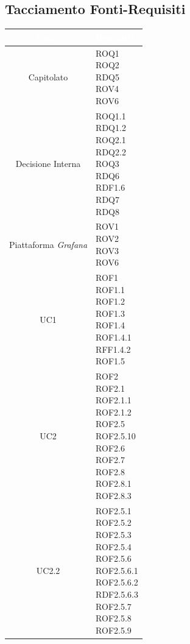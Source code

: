 \subsection{Tacciamento Fonti-Requisiti}\label{Tracciamento}
\begin{center}
\begin{longtable}[c]{|c|m{}|}
\hline
\rowcolor{bluelogo}\textbf{\textcolor{white}{Fonte}} & \textbf{\textcolor{white}{Requisiti}}\\
\hline \hline
\endhead
Capitolato & \makecell{ROQ1\\ROQ2\\RDQ5\\ROV4\\ROV6}\\
\hline
\rowcolor{grigio}Decisione Interna & \makecell{ROQ1.1\\RDQ1.2\\ROQ2.1\\RDQ2.2\\ROQ3\\RDQ6\\RDF1.6\\RDQ7\\RDQ8}\\
\hline
Piattaforma \textit{Grafana} & \makecell{ROV1\\ROV2\\ROV3\\ROV6}\\
\hline
\rowcolor{grigio}UC1 & \makecell{ROF1\\ROF1.1\\ROF1.2\\ROF1.3\\ROF1.4\\ROF1.4.1\\RFF1.4.2\\ROF1.5}\\
\hline
UC2 & \makecell{ROF2\\ROF2.1\\ROF2.1.1\\ROF2.1.2\\ROF2.5\\ROF2.5.10\\ROF2.6\\ROF2.7\\ROF2.8\\ROF2.8.1\\ROF2.8.3}\\
\hline
\rowcolor{grigio}UC2.2 & \makecell{ROF2.5.1\\ROF2.5.2\\ROF2.5.3\\ROF2.5.4\\ROF2.5.6\\ROF2.5.6.1\\ROF2.5.6.2\\RDF2.5.6.3\\ROF2.5.7\\ROF2.5.8\\ROF2.5.9}\\

\end{longtable}
\end{center}
